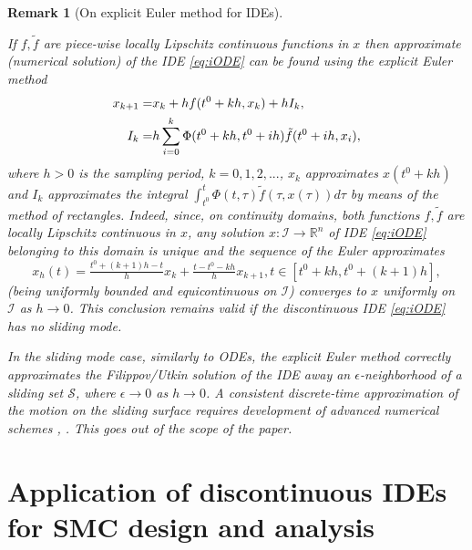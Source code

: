 \documentclass{article}
\newcommand{\R}{\mathbb{R}}
\newtheorem{remark}{Remark}
\begin{document}
\begin{remark}[On explicit Euler method for IDEs]\label{rem:1}
	
	If $f,\tilde f$ are piece-wise locally Lipschitz continuous functions in $x$ then approximate (numerical solution) of the IDE  \eqref{eq:iODE} can be found using the explicit Euler method  \vspace{-1mm}
	\begin{equation}\label{eq:explicit_Euler_IDE}
		\vspace{-1mm}
		\begin{split}
			x_{k+1}=&x_{k}+hf(t^0+kh,x_{k})+hI_k,\\
			I_k=&h\sum^{k}_{i=0} \Phi(t^0+kh,t^0+ih)\tilde f(t^0+ih,x_i), 
		\end{split}
	\end{equation}
	where $h>0$ is the sampling period, $k=0,1,2,...$, $x_k$ approximates $x(t^0+kh)$ and
	$I_k$ approximates the integral $\int^t_{t^0}\Phi(t,\tau)\tilde f(\tau,x(\tau)) d\tau$ by means of the method of rectangles. Indeed, since, on continuity domains, both functions $f,\tilde f$ are locally  Lipschitz continuous in $x$, any solution $x:\mathcal{I}\to \R^n$ of IDE  \eqref{eq:iODE} belonging to  this domain is unique and  the sequence of the Euler approximates
	\[
	x_{h}(t)\!=\!\tfrac{t^0\!+(k+1)h-t}{h}x_k+\tfrac{t-t^0\!-kh}{h}x_{k+1}, t\!\in\![t^0\!+kh,t^0\!+(k+1)h], 
	\]
	(being uniformly bounded and equicontinuous on $\mathcal{I}$) converges to $x$ uniformly on $\mathcal{I}$ as $h\to 0$. This conclusion remains valid  if the discontinuous IDE  \eqref{eq:iODE} has no sliding mode.
	
	In the sliding mode case, similarly to ODEs,
	the explicit Euler method correctly approximates the Filippov/Utkin solution of the IDE away an $\epsilon$-neighborhood of a sliding set $\mathcal{S}$, where $\epsilon\to 0$ as $h\to 0$.      
	A consistent discrete-time approximation of the motion on the sliding surface requires development
	of advanced numerical schemes \cite{AcaryBrogliato2010:SCL}, \cite{Polyakov_etal2019:SIAM_JCO}. This goes out of the scope of the paper.
\end{remark}
\section{Application of discontinuous IDEs for SMC design and analysis}\label{sec:SMC_design}
\end{document}
